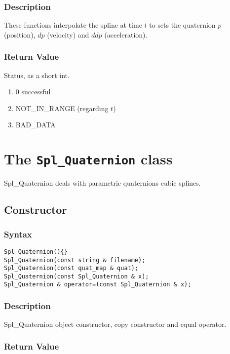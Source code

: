 \documentclass[11pt,fleqn,letterpaper]{report}
\begin{document}
\subsubsection*{Description}   
These functions interpolate the spline at time $t$ to sets the
quaternion $p$ (position), $dp$ (velocity) and $ddp$ (acceleration).

\subsubsection*{Return Value}

Status, as a short int.
\begin{enumerate}
\item[] 0 successful
\item[] NOT\_IN\_RANGE (regarding $t$)
\item[] BAD\_DATA
\end{enumerate}

\newpage

\section{The \texttt{Spl\_Quaternion} class}

Spl\_Quaternion deals with parametric quaternions cubic splines.

\subsection*{Constructor}
\subsubsection*{Syntax}
\begin{verbatim}
Spl_Quaternion(){}
Spl_Quaternion(const string & filename);
Spl_Quaternion(const quat_map & quat);
Spl_Quaternion(const Spl_Quaternion & x);
Spl_Quaternion & operator=(const Spl_Quaternion & x);
\end{verbatim}

\subsubsection*{Description}   
Spl\_Quaternion object constructor, copy constructor and equal operator.

\subsubsection*{Return Value}
\end{document}
